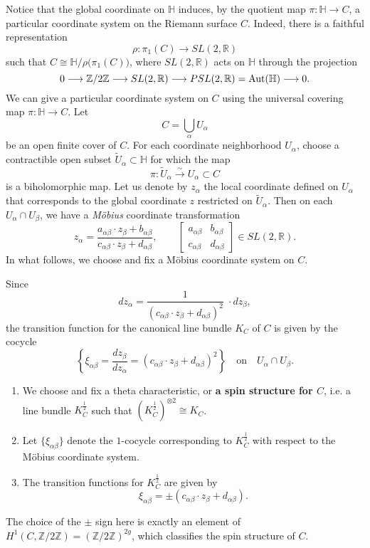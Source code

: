 \documentclass[oneside, 11pt]{amsart}
\theoremstyle{definition}
\numberwithin{equation}{subsection}
\def\Aut{{\text{\rm{Aut}}}}
\def\isom{\cong}
\def\tensor{\otimes}
\def\a{\alpha}
\def\b{\beta}
\newcommand{\be}{\begin{equation}}
\newcommand{\ee}{\end{equation}}
\newcommand{\bH}{{\mathbb{H}}}
\newcommand{\bR}{{\mathbb{R}}}
\newcommand{\bZ}{{\mathbb{Z}}}
\newcommand{\half}{{\frac{1}{2}}}
\newcommand{\lrar}{\longrightarrow}
\begin{document}
Notice that the global coordinate on $\mathbb{H}$ induces, by the quotient map $\pi: \mathbb{H}\stackrel{}{\rightarrow} C$, a particular coordinate system on the Riemann surface $C$. Indeed, there is a faithful representation 
$$
\rho:\pi_1(C)\lrar SL(2,\bR)
$$
such that $C \isom \bH\big/\rho\big(\pi_1(C)\big)$,
where $SL(2,\bR)$ acts on $\bH$ through
the projection
$$
0\lrar \bZ/2\bZ \lrar SL(2,\bR) \lrar
PSL(2,\bR) = \Aut(\bH) \lrar 0.
$$
We can give a particular coordinate system on $C$
using the universal covering map $\pi:\bH \lrar C$.
Let 
$$
C = \bigcup_\a U_\a
$$
be an open finite cover of $C$.
For each coordinate neighborhood $U_\a$, 
choose a contractible open subset $\widetilde{U}_\a
\subset\bH$ for which the map
$$
\pi:\widetilde{U}_\a\overset{\sim}{\lrar}U_\a\subset C
$$
is a biholomorphic map. Let us denote by $z_\a$
the local coordinate defined on $U_\a$ that corresponds
to the global coordinate $z$ restricted on 
$\widetilde{U}_\a$. Then on each $U_\a \cap U_\b$,
we have a \emph{M\"obius} coordinate transformation
\be
\label{Mobius}
z_\a = \frac{a_{\a\b}\cdot z_\b + b_{\a\b}}
{c_{\a\b} \cdot z_\b + d_{\a\b}}, 
\qquad 
\begin{bmatrix}
a_{\a\b}&b_{\a\b}\\
c_{\a\b}&d_{\a\b}
\end{bmatrix}
\in SL(2,\bR).
\ee
In what follows, we choose and fix a M\"obius 
coordinate system on $C$. 



Since 
$$
dz_\a = \frac{1}{(c_{\a\b} \cdot z_\b + d_{\a\b})^2}
\; \cdot dz_\b,
$$
the transition function for the canonical line bundle
$K_C$ of $C$ is given by
the cocycle 
$$
\left\{\xi_{\a\b}=\frac{dz_{\b}}{dz_{\a}}=(c_{\a\b} \cdot z_\b + d_{\a\b})^2\right\}
\quad \text{on} \quad U_\a\cap U_\b.
$$
\begin{enumerate}
\item We choose and fix a theta characteristic,
or \textbf{a spin structure for $C$}, i.e. a line bundle $K_C^{\half}$ such that 
$(K_C^{\half})^{\tensor 2} \isom K_C$.
\item Let $\{\xi_{\a\b}\}$ denote the $1$-cocycle 
corresponding to $K_C^{\half}$
with respect to the M\"obius coordinate system. 
\item The transition functions for $K_C^{\frac{1}{2}}$ are given by
\be 
\label{spin}
\xi_{\a\b} = \pm (c_{\a\b}\cdot z_\b + d_{\a\b}).
\ee
\end{enumerate}
The choice of the $\pm$ sign here is exactly 
an element of $H^1(C,\bZ/2\bZ) = (\bZ/2\bZ)^{2g}$,
which classifies the spin structure of $C$. 
\end{document}
